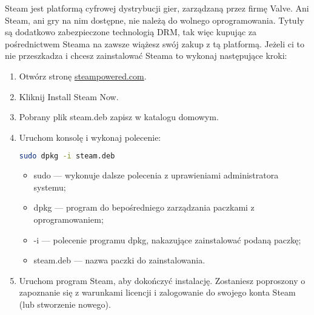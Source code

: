 Steam jest platformą cyfrowej dystrybucji gier, zarządzaną przez firmę Valve. Ani Steam, ani gry na nim dostępne, nie należą do wolnego oprogramowania. Tytuły są dodatkowo zabezpieczone technologią DRM, tak więc kupując za pośrednictwem Steama na zawsze wiążesz swój zakup z tą platformą. Jeżeli ci to nie przeszkadza i chcesz zainstalować Steama to wykonaj następujące kroki:
\begin{enumerate}
\item Otwórz stronę \href{http://store.steampowered.com/about/}{steampowered.com}.
\item Kliknij \textcolor{ubuntu_orange}{Install Steam Now}.
\item Pobrany plik steam.deb zapisz w katalogu domowym.
\item Uruchom konsolę  i wykonaj polecenie:
\begin{lstlisting}[language=bash]
sudo dpkg -i steam.deb
\end{lstlisting}
\begin{itemize}
\item \textcolor{ubuntu_orange}{sudo} --- wykonuje dalsze polecenia z uprawieniami administratora systemu;
\item \textcolor{ubuntu_orange}{dpkg} --- program do bepośredniego zarządzania paczkami z oprogramowaniem;
\item \textcolor{ubuntu_orange}{-i} --- polecenie programu dpkg, nakazujące zainstalować podaną paczkę;
\item \textcolor{ubuntu_orange}{steam.deb} --- nazwa paczki do zainstalowania.
\end{itemize}
\item Uruchom program Steam, aby dokończyć instalację. Zostaniesz poproszony o zapoznanie się z warunkami licencji i zalogowanie do swojego konta Steam (lub stworzenie nowego).
\end{enumerate}
